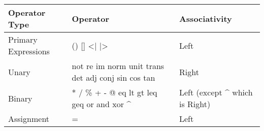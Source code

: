 \begin{flushleft}
\begin{tabular}{|l|l|l|}
	\hline    
	                   
	Operator Type & 
	Operator & 
	Associativity\\
	
	\hline
	Primary Expressions &
	\textsf{() [] <| |>} &
	Left\\
	Unary & 
	\textsf{not re im norm unit trans det adj conj sin cos tan} & 
	Right\\
	Binary & 
	\textsf{* / \% + - @ eq lt gt leq geq or and xor \string^} &
	Left (except \string^ which is Right)\\
	Assignment &
	\textsf{=} 
	& Left\\
	
	\hline  
\end{tabular}
\end{flushleft}
